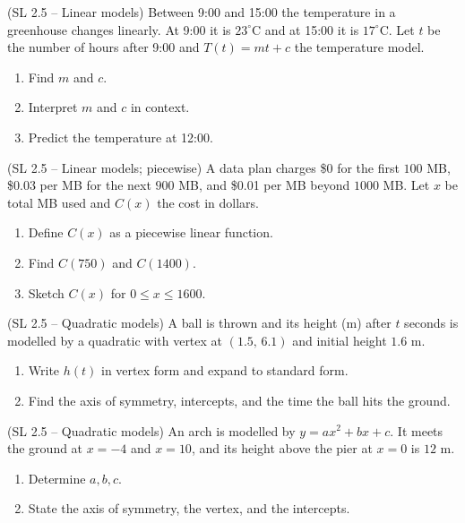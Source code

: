 \documentclass[11pt]{article}
\def\textit#1{#1}%
\newcounter{question}
\begin{document}

\begin{question}
\textit{(SL 2.5 – Linear models)}
Between 9:00 and 15:00 the temperature in a greenhouse changes linearly. At 9:00 it is $23^\circ$C and at 15:00 it is $17^\circ$C. Let $t$ be the number of hours after 9:00 and $T(t)=mt+c$ the temperature model.
\begin{enumerate}
  \item Find $m$ and $c$.
  \item Interpret $m$ and $c$ in context.
  \item Predict the temperature at 12:00.
\end{enumerate}
\end{question}

\begin{question}
\textit{(SL 2.5 – Linear models; piecewise)}
A data plan charges \$0 for the first $100$ MB, \$0.03 per MB for the next $900$ MB, and \$0.01 per MB beyond $1000$ MB. Let $x$ be total MB used and $C(x)$ the cost in dollars.
\begin{enumerate}
  \item Define $C(x)$ as a piecewise linear function.
  \item Find $C(750)$ and $C(1400)$.
  \item Sketch $C(x)$ for $0\le x \le 1600$.
\end{enumerate}
\end{question}

\begin{question}
\textit{(SL 2.5 – Quadratic models)}
A ball is thrown and its height (m) after $t$ seconds is modelled by a quadratic with vertex at $(1.5,\,6.1)$ and initial height $1.6$ m.
\begin{enumerate}
  \item Write $h(t)$ in vertex form and expand to standard form.
  \item Find the axis of symmetry, intercepts, and the time the ball hits the ground.
\end{enumerate}
\end{question}

\begin{question}
\textit{(SL 2.5 – Quadratic models)}
An arch is modelled by $y=ax^2+bx+c$. It meets the ground at $x=-4$ and $x=10$, and its height above the pier at $x=0$ is $12$ m.
\begin{enumerate}
  \item Determine $a,b,c$.
  \item State the axis of symmetry, the vertex, and the intercepts.
\end{enumerate}
\end{question}
\end{document}
